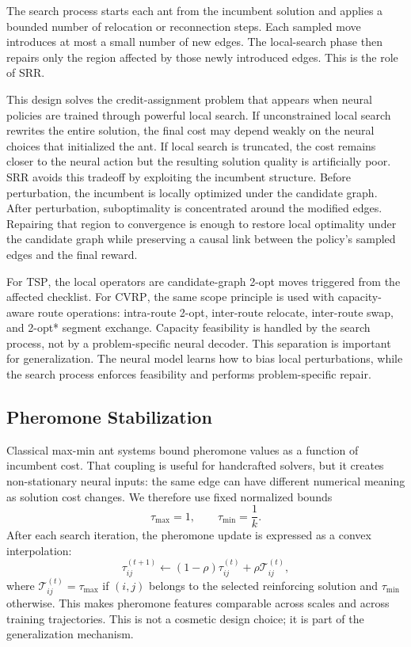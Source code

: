 \documentclass[11pt]{article}
\newcommand{\TSP}{\textsc{TSP}}
\newcommand{\CVRP}{\textsc{CVRP}}
\newcommand{\SRR}{\textsc{SRR}}
\begin{document}
The search process starts each ant from the incumbent solution and applies a bounded number of relocation or reconnection steps.
Each sampled move introduces at most a small number of new edges.
The local-search phase then repairs only the region affected by those newly introduced edges.
This is the role of \SRR{}.

This design solves the credit-assignment problem that appears when neural policies are trained through powerful local search.
If unconstrained local search rewrites the entire solution, the final cost may depend weakly on the neural choices that initialized the ant.
If local search is truncated, the cost remains closer to the neural action but the resulting solution quality is artificially poor.
\SRR{} avoids this tradeoff by exploiting the incumbent structure.
Before perturbation, the incumbent is locally optimized under the candidate graph.
After perturbation, suboptimality is concentrated around the modified edges.
Repairing that region to convergence is enough to restore local optimality under the candidate graph while preserving a causal link between the policy's sampled edges and the final reward.

For \TSP{}, the local operators are candidate-graph 2-opt moves triggered from the affected checklist.
For \CVRP{}, the same scope principle is used with capacity-aware route operations:
intra-route 2-opt, inter-route relocate, inter-route swap, and 2-opt* segment exchange.
Capacity feasibility is handled by the search process, not by a problem-specific neural decoder.
This separation is important for generalization.
The neural model learns how to bias local perturbations, while the search process enforces feasibility and performs problem-specific repair.

\subsection{Pheromone Stabilization}
\label{sec:pheromone-stabilization}

Classical max-min ant systems bound pheromone values as a function of incumbent cost.
That coupling is useful for handcrafted solvers, but it creates non-stationary neural inputs: the same edge can have different numerical meaning as solution cost changes.
We therefore use fixed normalized bounds
\begin{equation}
\tau_{\max}=1,
\qquad
\tau_{\min}=\frac{1}{k}.
\end{equation}
After each search iteration, the pheromone update is expressed as a convex interpolation:
\begin{equation}
\tau_{ij}^{(t+1)}
\leftarrow
(1-\rho)\tau_{ij}^{(t)}
+
\rho \mathcal{T}_{ij}^{(t)},
\end{equation}
where $\mathcal{T}_{ij}^{(t)}=\tau_{\max}$ if $(i,j)$ belongs to the selected reinforcing solution and $\tau_{\min}$ otherwise.
This makes pheromone features comparable across scales and across training trajectories.
This is not a cosmetic design choice; it is part of the generalization mechanism.
\end{document}

